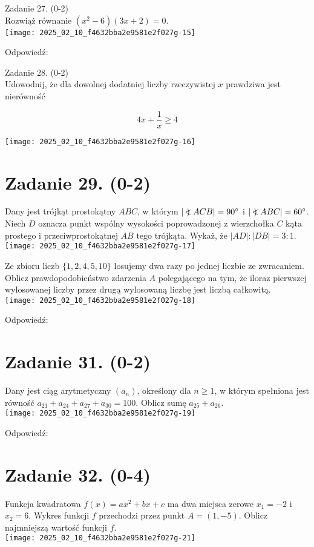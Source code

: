\documentclass[10pt]{article}
\newcommand\Varangle{\mathop{{<\!\!\!\!\!\text{\small)}}\:}\nolimits}
\begin{document}
Zadanie 27. (0-2)\\
Rozwiąż równanie \(\left(x^{2}-6\right)(3 x+2)=0\).\\
\texttt{[image: 2025\_02\_10\_f4632bba2e9581e2f027g-15]}

Odpowiedź:

Zadanie 28. (0-2)\\
Udowodnij, że dla dowolnej dodatniej liczby rzeczywistej \(x\) prawdziwa jest nierówność

\[
4 x+\frac{1}{x} \geq 4
\]

\begin{center}
\texttt{[image: 2025\_02\_10\_f4632bba2e9581e2f027g-16]}
\end{center}

\section*{Zadanie 29. (0-2)}
Dany jest trójkąt prostokątny \(A B C\), w którym \(|\Varangle A C B|=90^{\circ}\) i \(|\Varangle A B C|=60^{\circ}\). Niech \(D\) oznacza punkt wspólny wysokości poprowadzonej z wierzchołka \(C\) kąta prostego i przeciwprostokątnej \(A B\) tego trójkąta. Wykaż, że \(|A D|:|D B|=3: 1\).\\
\texttt{[image: 2025\_02\_10\_f4632bba2e9581e2f027g-17]}

Ze zbioru liczb \(\{1,2,4,5,10\}\) losujemy dwa razy po jednej liczbie ze zwracaniem. Oblicz prawdopodobieństwo zdarzenia \(A\) polegającego na tym, że iloraz pierwszej wylosowanej liczby przez drugą wylosowaną liczbę jest liczbą całkowitą.\\
\texttt{[image: 2025\_02\_10\_f4632bba2e9581e2f027g-18]}

Odpowiedź:

\section*{Zadanie 31. (0-2)}
Dany jest ciąg arytmetyczny \(\left(a_{n}\right)\), określony dla \(n \geq 1\), w którym spełniona jest równość \(a_{21}+a_{24}+a_{27}+a_{30}=100\). Oblicz sumę \(a_{25}+a_{26}\).\\
\texttt{[image: 2025\_02\_10\_f4632bba2e9581e2f027g-19]}

Odpowiedź:

\section*{Zadanie 32. (0-4)}
Funkcja kwadratowa \(f(x)=a x^{2}+b x+c\) ma dwa miejsca zerowe \(x_{1}=-2\) i \(x_{2}=6\). Wykres funkcji \(f\) przechodzi przez punkt \(A=(1,-5)\). Oblicz najmniejszą wartość funkcji \(f\).\\
\(\qquad\)\\
\texttt{[image: 2025\_02\_10\_f4632bba2e9581e2f027g-21]}
\end{document}
